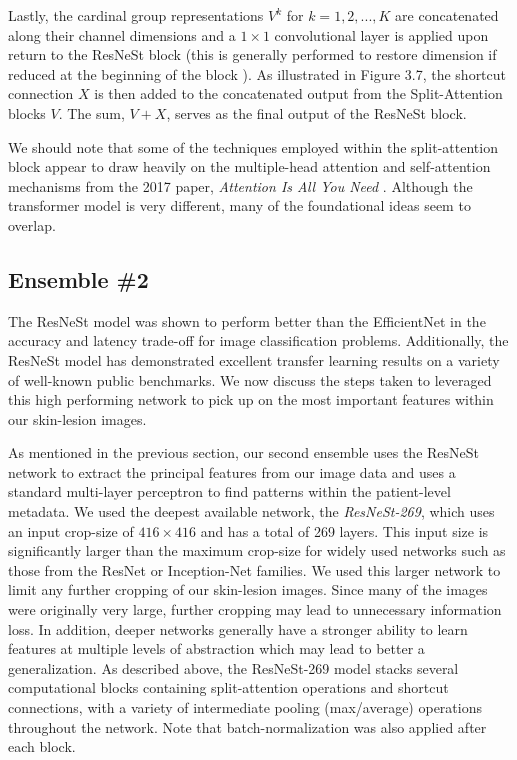 \documentclass [MAS] {uclathes}
\begin{document}
Lastly, the cardinal group representations $V^k$ for $k=1, 2, ..., K$ are concatenated along their channel dimensions and a $1 \times 1$ convolutional layer is applied upon return to the ResNeSt block (this is generally performed to restore dimension if reduced at the beginning of the block \cite{resnet}). As illustrated in Figure 3.7, the shortcut connection $X$ is then added to the concatenated output from the Split-Attention blocks $V$. The sum, $V+X$, serves as the final output of the ResNeSt block.

We should note that some of the techniques employed within the split-attention block appear to draw heavily on the multiple-head attention and self-attention mechanisms from the 2017 paper, \textit{Attention Is All You Need} \cite{attention}. Although the transformer model is very different, many of the foundational ideas seem to overlap.

\subsection{Ensemble \#2}

The ResNeSt model was shown to perform better than the EfficientNet in the accuracy and latency trade-off for image classification problems. Additionally, the ResNeSt model has demonstrated excellent transfer learning results on a variety of well-known public benchmarks. We now discuss the steps taken to leveraged this high performing network to pick up on the most important features within our skin-lesion images.

As mentioned in the previous section, our second ensemble uses the ResNeSt network to extract the principal features from our image data and uses a standard multi-layer perceptron to find patterns within the patient-level metadata. We used the deepest available network, the \textit{ResNeSt-269}, which uses an input crop-size of $416 \times 416$ and has a total of 269 layers. This input size is significantly larger than the maximum crop-size for widely used networks such as those from the ResNet or Inception-Net families. We used this larger network to limit any further cropping of our skin-lesion images. Since many of the images were originally very large, further cropping may lead to unnecessary information loss. In addition, deeper networks generally have a stronger ability to learn features at multiple levels of abstraction which may lead to better a generalization. As described above, the ResNeSt-269 model stacks several computational blocks containing split-attention operations and shortcut connections, with a variety of intermediate pooling (max/average) operations throughout the network. Note that batch-normalization was also applied after each block.
\end{document}
